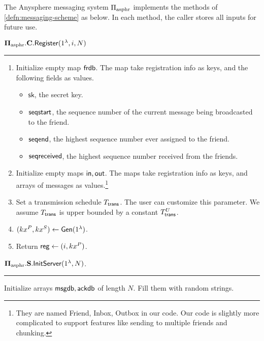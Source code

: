 \begin{definition}
The Anysphere messaging system $\Pi_{\text{asphr}}$ implements the methods of \cref{defn:messaging-scheme} as below. In each method, the caller stores all inputs for future use.
\vspace{10pt}

$\mathbf{\Pi_{\text{asphr}}.C.\mathsf{Register}}(1^{\lambda}, i, N)$
\vspace{5pt}
\hrule
\vspace{5pt}
\begin{enumerate}
    \item Initialize empty map $\mathsf{frdb}$. The map take registration info as keys, and the following fields as values.
    \begin{itemize}
        \item $\mathsf{sk}$, the secret key.
        \item $\mathsf{seqstart}$, the sequence number of the current message being broadcasted to the friend.
        \item $\mathsf{seqend}$, the highest sequence number ever assigned to the friend.
        \item $\mathsf{seqreceived}$, the highest sequence number received from the friends.
    \end{itemize}
    \item Initialize empty maps $\mathsf{in}, \mathsf{out}$. The maps take registration info as keys, and arrays of messages as values.\footnote{They are named Friend, Inbox, Outbox in our code. Our code is slightly more complicated to support features like sending to multiple friends and chunking.}
    \item Set a transmission schedule $T_{\mathsf{trans}}$. The user can customize this parameter. We assume $T_{\mathsf{trans}}$ is upper bounded by a constant $T_{\mathsf{trans}}^U$.
    \item $(kx^P, kx^S) \leftarrow \mathsf{Gen}(1^{\lambda})$. 
    \item Return $\mathsf{reg} \leftarrow (i, kx^P)$.
\end{enumerate}
\vspace{10pt}
$\mathbf{\Pi_{\text{asphr}}.S.\mathsf{InitServer}}(1^{\lambda}, N)$.
\vspace{5pt}
\hrule
\vspace{5pt}
Initialize arrays $\mathsf{msgdb}, \mathsf{ackdb}$ of length $N$. Fill them with random strings.


\end{definition}
